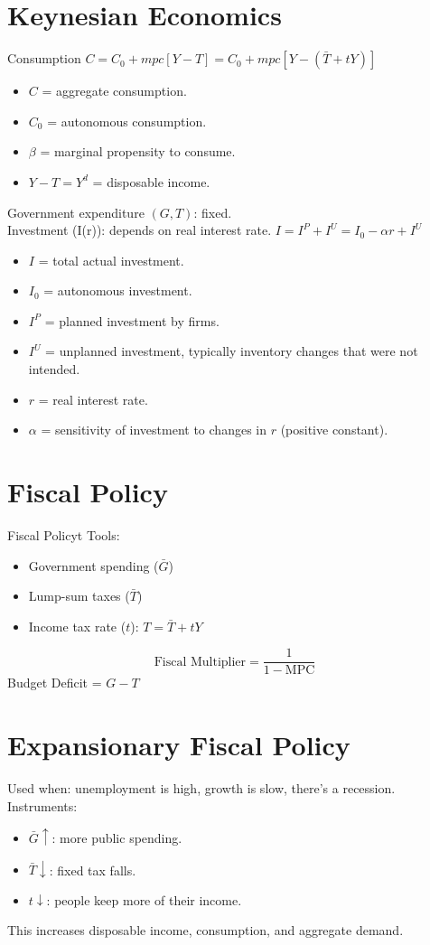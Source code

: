 \documentclass[a4paper, 11pt]{article}
\begin{document}
\section{Keynesian Economics}
Consumption $C=C_0 + mpc[Y-T]=C_0 + mpc[Y-(\bar{T}+tY)]$
\begin{itemize}
    \item $C$ = aggregate consumption.
    \item $C_0$ = autonomous consumption.
    \item $\beta$ = marginal propensity to consume.
    \item $Y-T=Y^d$ = disposable income.
\end{itemize}
Government expenditure $(G, T)$: fixed.\\
Investment (I(r)): depends on real interest rate.
$I = I^P + I^U=I_0 -\alpha r + I^U$
\begin{itemize}
    \item $I$ = total actual investment.
    \item $I_0$ = autonomous investment.
    \item $I^P$ = planned investment by firms.
    \item $I^U$ = unplanned investment, typically inventory changes that were not intended.
    \item $r$ = real interest rate.
    \item $\alpha$ = sensitivity of investment to changes in $r$ (positive constant).
\end{itemize}

\section{Fiscal Policy}
Fiscal Policyt Tools:
\begin{itemize}
    \item Government spending ($\bar{G}$)
    \item Lump-sum taxes ($\bar{T}$)
    \item Income tax rate ($t$): $T = \bar{T} + tY$
\end{itemize}
\[
\text{Fiscal Multiplier} = \frac{1}{1- \text{MPC}}
\]
Budget Deficit = $G - T$

\section{Expansionary Fiscal Policy}
Used when: unemployment is high, growth is slow, there's a recession.\\
Instruments:
\begin{itemize}
    \item $\bar{G}\uparrow$: more public spending.
    \item $\bar{T}\downarrow$: fixed tax falls.
    \item $t\downarrow$: people keep more of their income.
\end{itemize}
This increases disposable income, consumption, and aggregate demand.
\end{document}
